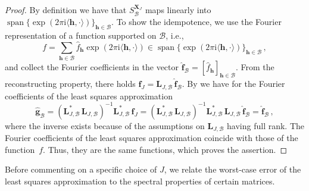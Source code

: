 \documentclass[a4paper]{amsart}
\renewcommand{\hat}{\widehat}
\DeclareMathOperator{\Span}{span}
\begin{document}
\begin{proof} By definition we have that $S_{\mathcal B}^{\bm X_J}$ maps linearly into $\Span\{\exp(2\pi\mathrm i\langle\bm h,\cdot\rangle)\}_{\bm h\in\mathcal B}$.
    To show the idempotence, we use the Fourier representation of a function supported on $\mathcal B$, i.e.,
    \begin{equation*}
        f = \sum_{\bm h\in\mathcal B} \hat f_{\bm h}\exp(2\pi\mathrm i\langle\bm h,\cdot\rangle) \in\Span\{\exp(2\pi\mathrm i\langle\bm h,\cdot\rangle)\}_{\bm h\in\mathcal B}\,,
    \end{equation*}
    and collect the Fourier coefficients in the vector $\bm{\hat f}_{\mathcal B} = [\hat f_{\bm h}]_{\bm h\in\mathcal B}$.
    From the reconstructing property, there holds $\bm f_J = \bm L_{J,\mathcal B}\,\bm{\hat f}_{\mathcal B}$.
    By  we have for the Fourier coefficients of the least squares approximation
    \begin{equation*}
        \bm{\hat g}_{\mathcal B}
        = (\bm L_{J,\mathcal B}^\ast\,\bm L_{J,\mathcal B})^{-1} \bm L_{J,\mathcal B}^\ast \, \bm f_J
        = (\bm L_{J,\mathcal B}^\ast\,\bm L_{J,\mathcal B})^{-1} \bm L_{J,\mathcal B}^\ast \, \bm L_{J,\mathcal B} \, \bm{\hat f}_{\mathcal B}
        = \bm{\hat f}_{\mathcal B} \,,
    \end{equation*}
    where the inverse exists because of the assumptions on $\bm L_{J,\mathcal B}$ having full rank.
    The Fourier coefficients of the least squares approximation coincide with those of the function~$f$.
    Thus, they are the same functions, which proves the assertion.
\end{proof} 

Before commenting on a specific choice of $J$, we relate the worst-case error of the least squares approximation to the spectral properties of certain matrices.
\end{document}
